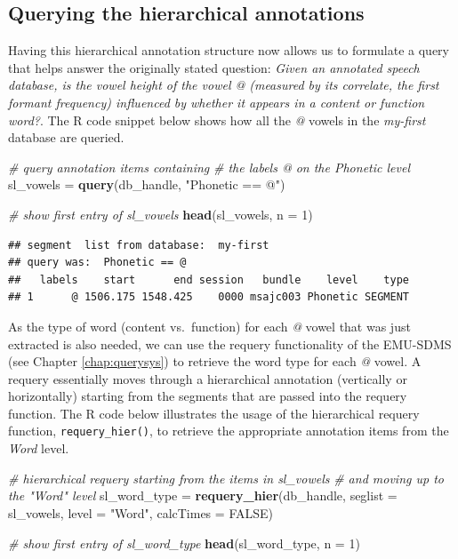 \documentclass[]{book}
\newenvironment{Shaded}{\begin{snugshade}}{\end{snugshade}}
\newcommand{\CommentTok}[1]{\textcolor[rgb]{0.56,0.35,0.01}{\textit{#1}}}
\newcommand{\DataTypeTok}[1]{\textcolor[rgb]{0.13,0.29,0.53}{#1}}
\newcommand{\DecValTok}[1]{\textcolor[rgb]{0.00,0.00,0.81}{#1}}
\newcommand{\KeywordTok}[1]{\textcolor[rgb]{0.13,0.29,0.53}{\textbf{#1}}}
\newcommand{\NormalTok}[1]{#1}
\newcommand{\OtherTok}[1]{\textcolor[rgb]{0.56,0.35,0.01}{#1}}
\newcommand{\StringTok}[1]{\textcolor[rgb]{0.31,0.60,0.02}{#1}}
\begin{document}
\hypertarget{querying-the-hierarchical-annotations}{%
\subsection{Querying the hierarchical annotations}\label{querying-the-hierarchical-annotations}}

Having this hierarchical annotation structure now allows us to formulate a query that helps answer the originally stated question: \emph{Given an annotated speech database, is the vowel height of the vowel @ (measured by its correlate, the first formant frequency) influenced by whether it appears in a content or function word?}. The R code snippet below shows how all the \emph{@} vowels in the \emph{my-first} database are queried.

\begin{Shaded}
\begin{Highlighting}[]
\CommentTok{# query annotation items containing}
\CommentTok{# the labels @ on the Phonetic level}
\NormalTok{sl_vowels =}\StringTok{ }\KeywordTok{query}\NormalTok{(db_handle, }\StringTok{"Phonetic == @"}\NormalTok{)}

\CommentTok{# show first entry of sl_vowels}
\KeywordTok{head}\NormalTok{(sl_vowels, }\DataTypeTok{n =} \DecValTok{1}\NormalTok{)}
\end{Highlighting}
\end{Shaded}

\begin{verbatim}
## segment  list from database:  my-first 
## query was:  Phonetic == @ 
##   labels    start      end session   bundle    level    type
## 1      @ 1506.175 1548.425    0000 msajc003 Phonetic SEGMENT
\end{verbatim}

As the type of word (content vs.~function) for each \emph{@} vowel that was just extracted is also needed, we can use the requery functionality of the EMU-SDMS (see Chapter \ref{chap:querysys}) to retrieve the word type for each \emph{@} vowel. A requery essentially moves through a hierarchical annotation (vertically or horizontally) starting from the segments that are passed into the requery function. The R code below illustrates the usage of the hierarchical requery function, \texttt{requery\_hier()}, to retrieve the appropriate annotation items from the \emph{Word} level.

\begin{Shaded}
\begin{Highlighting}[]
\CommentTok{# hierarchical requery starting from the items in sl_vowels}
\CommentTok{# and moving up to the "Word" level}
\NormalTok{sl_word_type =}\StringTok{ }\KeywordTok{requery_hier}\NormalTok{(db_handle,}
                           \DataTypeTok{seglist =}\NormalTok{ sl_vowels,}
                           \DataTypeTok{level =} \StringTok{"Word"}\NormalTok{,}
                           \DataTypeTok{calcTimes =} \OtherTok{FALSE}\NormalTok{)}

\CommentTok{# show first entry of sl_word_type}
\KeywordTok{head}\NormalTok{(sl_word_type, }\DataTypeTok{n =} \DecValTok{1}\NormalTok{)}
\end{Highlighting}
\end{Shaded}
\end{document}
